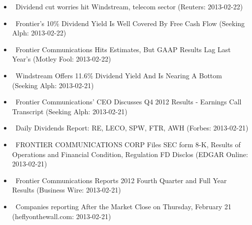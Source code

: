 \documentclass[11pt,asymmetric]{article}
\begin{document}
\begin{itemize}
\item\ Dividend cut worries hit Windstream, telecom sector (Reuters: 2013-02-22)
\item\ Frontier's 10\% Dividend Yield Is Well Covered By Free Cash Flow (Seeking Alph: 2013-02-22)
\item\ Frontier Communications Hits Estimates, But GAAP Results Lag Last Year's (Motley Fool: 2013-02-22)
\item\ Windstream Offers 11.6\% Dividend Yield And Is Nearing A Bottom (Seeking Alph: 2013-02-21)
\item\ Frontier Communications' CEO Discusses Q4 2012 Results - Earnings Call Transcript (Seeking Alph: 2013-02-21)
\item\ Daily Dividends Report: RE, LECO, SPW, FTR, AWH (Forbes: 2013-02-21)
\item\ FRONTIER COMMUNICATIONS CORP Files SEC form 8-K, Results of Operations and Financial Condition, Regulation FD Disclos (EDGAR Online: 2013-02-21)
\item\ Frontier Communications Reports 2012 Fourth Quarter and Full Year Results (Business Wire: 2013-02-21)
\item\ Companies reporting After the Market Close on Thursday, February 21 (heflyonthewall.com: 2013-02-21)
\end{itemize}
\end{document}
